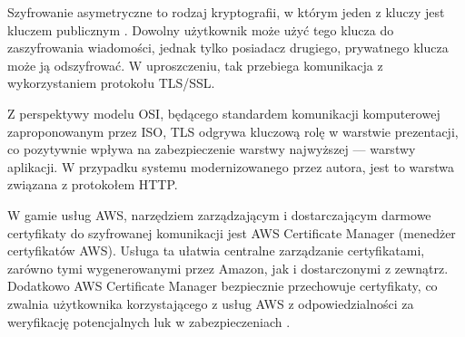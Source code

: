 \documentclass[12pt,twoside]{book}
\begin{document}
Szyfrowanie asymetryczne to rodzaj kryptografii, w którym jeden z kluczy jest kluczem publicznym \cite{nature.tls.ssl}. Dowolny użytkownik może użyć tego klucza do zaszyfrowania wiadomości, jednak tylko posiadacz drugiego, prywatnego klucza może ją odszyfrować. W uproszczeniu, tak przebiega komunikacja z wykorzystaniem protokołu TLS/SSL.

Z perspektywy modelu OSI, będącego standardem komunikacji komputerowej zaproponowanym przez ISO, TLS odgrywa kluczową rolę w warstwie prezentacji, co pozytywnie wpływa na zabezpieczenie warstwy najwyższej — warstwy aplikacji. W przypadku systemu modernizowanego przez autora, jest to warstwa związana z protokołem HTTP.

W gamie usług AWS, narzędziem zarządzającym i dostarczającym darmowe certyfikaty do szyfrowanej komunikacji jest AWS Certificate Manager (menedżer certyfikatów AWS). Usługa ta ułatwia centralne zarządzanie certyfikatami, zarówno tymi wygenerowanymi przez Amazon, jak i dostarczonymi z zewnątrz. Dodatkowo AWS Certificate Manager bezpiecznie przechowuje certyfikaty, co zwalnia użytkownika korzystającego z usług AWS z odpowiedzialności za weryfikację potencjalnych luk w zabezpieczeniach \cite{aws.acm}.




\listoffigures
\end{document}
